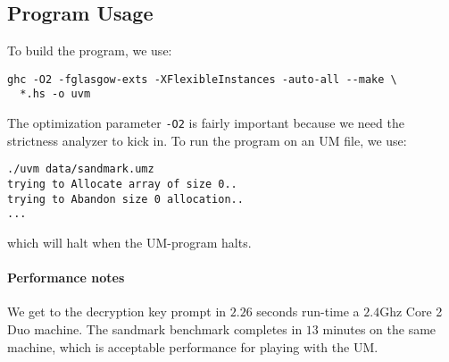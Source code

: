 \subsection*{Program Usage}

To build the program, we use:
\begin{verbatim}
ghc -O2 -fglasgow-exts -XFlexibleInstances -auto-all --make \
  *.hs -o uvm
\end{verbatim}

The optimization parameter \texttt{-O2} is fairly important because we
need the strictness analyzer to kick in. To run the program on an UM
file, we use:
\begin{verbatim}
./uvm data/sandmark.umz
trying to Allocate array of size 0..
trying to Abandon size 0 allocation..
...
\end{verbatim}
which will halt when the UM-program halts.

\paragraph{Performance notes}

We get to the decryption key prompt in $2.26$ seconds run-time a
$2.4$Ghz Core 2 Duo machine. The sandmark benchmark completes in
$13$ minutes on the same machine, which is acceptable performance for
playing with the UM.


